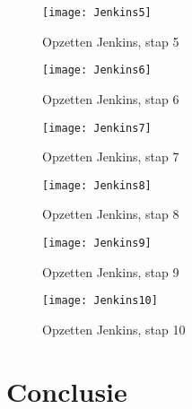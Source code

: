     \begin{figure}	
        \centering
        \texttt{[image: Jenkins5]}
        \caption{Opzetten Jenkins, stap 5} \label{Jenkins5}
    \end{figure}
    
    \begin{figure}	
        \centering
        \texttt{[image: Jenkins6]}
        \caption{Opzetten Jenkins, stap 6} \label{Jenkins6}
    \end{figure}

    \begin{figure}	
        \centering
        \texttt{[image: Jenkins7]}
        \caption{Opzetten Jenkins, stap 7} \label{Jenkins7}
    \end{figure}
    
    \begin{figure}	
        \centering
        \texttt{[image: Jenkins8]}
        \caption{Opzetten Jenkins, stap 8} \label{Jenkins8}
    \end{figure}
    
    \begin{figure}	
        \centering
        \texttt{[image: Jenkins9]}
        \caption{Opzetten Jenkins, stap 9} \label{Jenkins9}
    \end{figure}
    
    \begin{figure}	
        \centering
        \texttt{[image: Jenkins10]}
        \caption{Opzetten Jenkins, stap 10} \label{Jenkins10}
    \end{figure}
    
    
    
\section{Conclusie}
\label{sec:conclusie}
